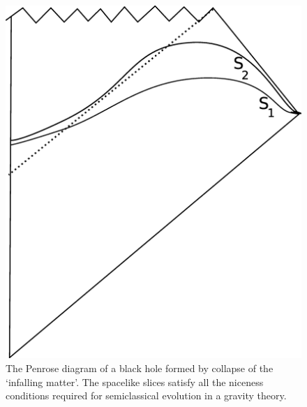 \documentclass[12pt]{article}
\begin{document}
\begin{figure}[htbp]
\begin{center}
\includegraphics[scale=.18]{fthree.eps}
\caption{{The Penrose diagram of a black hole formed by collapse of the `infalling matter'. The spacelike slices satisfy all the niceness conditions required for semiclassical evolution in a gravity theory.}}
\label{fthree}
\end{center}
\end{figure}
\end{document}
